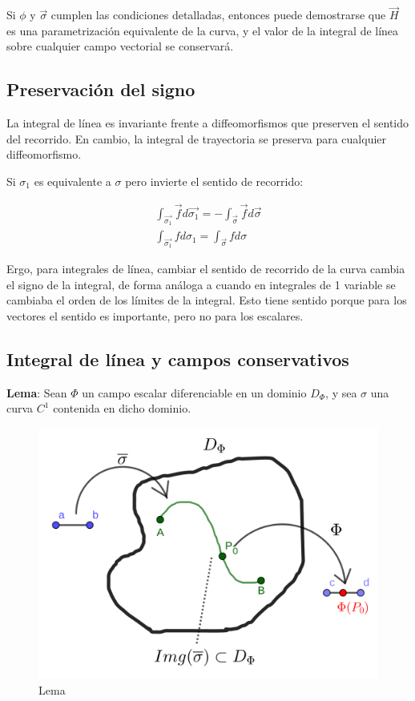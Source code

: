 \documentclass{article}
\begin{document}
Si $\phi$ y $\overrightarrow{\sigma}$ cumplen las condiciones detalladas, entonces puede demostrarse que $\overrightarrow{H}$ es una parametrización equivalente de la curva, y el valor de la integral de línea sobre cualquier campo vectorial se conservará.

\subsection{Preservación del signo}

La integral de línea es invariante frente a diffeomorfismos que preserven el sentido del recorrido. En cambio, la integral de trayectoria se preserva para cualquier diffeomorfismo.

Si $\sigma_1$ es equivalente a $\sigma$ pero invierte el sentido de recorrido:

\begin{gather}
\int_{\overrightarrow{\sigma_1}} \overrightarrow{f} d\overrightarrow{\sigma_1} = - \int_{\overrightarrow{\sigma}} \overrightarrow{f} d\overrightarrow{\sigma} \\
\int_{\overrightarrow{\sigma_1}} f d\sigma_1 = \int_{\overrightarrow{\sigma}} f d\sigma
\end{gather}

Ergo, para integrales de línea, cambiar el sentido de recorrido de la curva cambia el signo de la integral, de forma análoga a cuando en integrales de 1 variable se cambiaba el orden de los límites de la integral. Esto tiene sentido porque para los vectores el sentido es importante, pero no para los escalares.

\subsection{Integral de línea y campos conservativos}

\textbf{Lema}: Sean $\Phi$ un campo escalar diferenciable en un dominio $D_{\Phi}$, y sea $\sigma$ una curva $C^1$ contenida en dicho dominio. 

\begin{figure}[ht]
\centering
\caption{Lema}
\includegraphics[scale=0.75]{img/teo_fig014_cc.png}
\end{figure}
\end{document}
